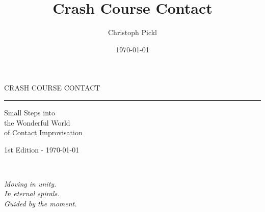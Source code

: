 \documentclass[a5paper,11pt]{book}
\title{Crash Course Contact}
\date{\today}
\author{Christoph Pickl}
\begin{document}
\begin{titlepage}
\begin{center}
	
	\vspace*{\fill}
	
	\fontsize{22}{0}\selectfont
    {\sffamily CRASH COURSE CONTACT}
	\vskip 5mm
	\rule{84mm}{0.4pt}
	\vskip 1mm
	\fontsize{15}{22}\selectfont
	{\sffamily Small Steps into \\ the Wonderful World \\ of Contact Improvisation}
	
	\vskip 70mm
	
	\vspace*{\fill}

	\fontsize{9}{0}\selectfont
	{\sffamily 1st Edition - \today}
\end{center}
\end{titlepage}

\pagestyle{empty}
\tableofcontents
\clearpage
\ifodd\value{page}\else
  \thispagestyle{empty}
\fi

\pagestyle{fancy}

~

\vfill
\begin{center}
	\textit{Moving in unity.}\\
	\textit{In eternal spirals.}\\
	\textit{Guided by the moment.}
\end{center}
\vfill
\newpage














\printglossaries
\end{document}
